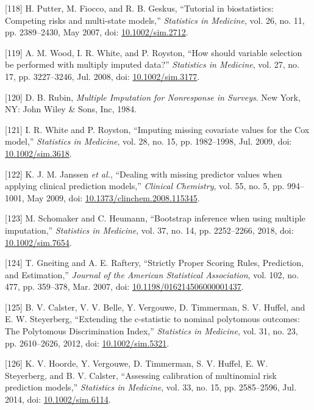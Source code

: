 \documentclass[12pt,PhD,twoside,openright]{muthesis}
\newenvironment{cslreferences}%
  {}%
  {\par}
\begin{document}
\begin{cslreferences}
\leavevmode\hypertarget{ref-putter_tutorial_2007}{}%
{[}118{]} H. Putter, M. Fiocco, and R. B. Geskus, ``Tutorial in biostatistics: Competing risks and multi-state models,'' \emph{Statistics in Medicine}, vol. 26, no. 11, pp. 2389--2430, May 2007, doi: \href{https://doi.org/10.1002/sim.2712}{10.1002/sim.2712}.

\leavevmode\hypertarget{ref-wood_how_2008}{}%
{[}119{]} A. M. Wood, I. R. White, and P. Royston, ``How should variable selection be performed with multiply imputed data?'' \emph{Statistics in Medicine}, vol. 27, no. 17, pp. 3227--3246, Jul. 2008, doi: \href{https://doi.org/10.1002/sim.3177}{10.1002/sim.3177}.

\leavevmode\hypertarget{ref-rubin_multiple_1984}{}%
{[}120{]} D. B. Rubin, \emph{Multiple Imputation for Nonresponse in Surveys}. New York, NY: John Wiley \& Sons, Inc, 1984.

\leavevmode\hypertarget{ref-white_imputing_2009}{}%
{[}121{]} I. R. White and P. Royston, ``Imputing missing covariate values for the Cox model,'' \emph{Statistics in Medicine}, vol. 28, no. 15, pp. 1982--1998, Jul. 2009, doi: \href{https://doi.org/10.1002/sim.3618}{10.1002/sim.3618}.

\leavevmode\hypertarget{ref-janssen_dealing_2009}{}%
{[}122{]} K. J. M. Janssen \emph{et al.}, ``Dealing with missing predictor values when applying clinical prediction models,'' \emph{Clinical Chemistry}, vol. 55, no. 5, pp. 994--1001, May 2009, doi: \href{https://doi.org/10.1373/clinchem.2008.115345}{10.1373/clinchem.2008.115345}.

\leavevmode\hypertarget{ref-schomaker_bootstrap_2018}{}%
{[}123{]} M. Schomaker and C. Heumann, ``Bootstrap inference when using multiple imputation,'' \emph{Statistics in Medicine}, vol. 37, no. 14, pp. 2252--2266, 2018, doi: \href{https://doi.org/10.1002/sim.7654}{10.1002/sim.7654}.

\leavevmode\hypertarget{ref-gneiting_strictly_2007}{}%
{[}124{]} T. Gneiting and A. E. Raftery, ``Strictly Proper Scoring Rules, Prediction, and Estimation,'' \emph{Journal of the American Statistical Association}, vol. 102, no. 477, pp. 359--378, Mar. 2007, doi: \href{https://doi.org/10.1198/016214506000001437}{10.1198/016214506000001437}.

\leavevmode\hypertarget{ref-calster_extending_2012-1}{}%
{[}125{]} B. V. Calster, V. V. Belle, Y. Vergouwe, D. Timmerman, S. V. Huffel, and E. W. Steyerberg, ``Extending the c-statistic to nominal polytomous outcomes: The Polytomous Discrimination Index,'' \emph{Statistics in Medicine}, vol. 31, no. 23, pp. 2610--2626, 2012, doi: \href{https://doi.org/10.1002/sim.5321}{10.1002/sim.5321}.

\leavevmode\hypertarget{ref-hoorde_assessing_2014}{}%
{[}126{]} K. V. Hoorde, Y. Vergouwe, D. Timmerman, S. V. Huffel, E. W. Steyerberg, and B. V. Calster, ``Assessing calibration of multinomial risk prediction models,'' \emph{Statistics in Medicine}, vol. 33, no. 15, pp. 2585--2596, Jul. 2014, doi: \href{https://doi.org/10.1002/sim.6114}{10.1002/sim.6114}.
\end{cslreferences}
\end{document}
